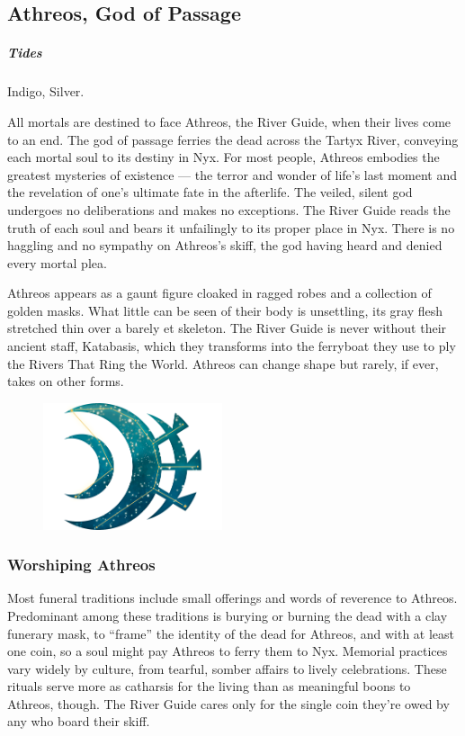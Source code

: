 \subsection*{Athreos, God of Passage} \label{ssec::athreos}
    \subparagraph{Tides} Indigo, Silver.

    All mortals are destined to face Athreos, the River Guide, when their lives come to an end.
    The god of passage ferries the dead across the Tartyx River, conveying each mortal soul to its destiny in Nyx.
    For most people, Athreos embodies the greatest mysteries of existence --- the terror and wonder of life's last moment and the revelation of one's ultimate fate in the afterlife.
    The veiled, silent god undergoes no deliberations and makes no exceptions.
    The River Guide reads the truth of each soul and bears it unfailingly to its proper place in Nyx.
    There is no haggling and no sympathy on Athreos's skiff, the god having heard and denied every mortal plea.

    Athreos appears as a gaunt figure cloaked in ragged robes and a collection of golden masks.
    What little can be seen of their body is unsettling, its gray flesh stretched thin over a barely et skeleton.
    The River Guide is never without their ancient staff, Katabasis, which they transforms into the ferryboat they use to ply the Rivers That Ring the World.
    Athreos can change shape but rarely, if ever, takes on other forms.

    \begin{figure}[t]
        \centering
        \includegraphics[width=0.47\textwidth]{02viphoger/img/10s_athreos.png}
    \end{figure}

    \subsubsection{Worshiping Athreos}
        Most funeral traditions include small offerings and words of reverence to Athreos.
        Predominant among these traditions is burying or burning the dead with a clay funerary mask, to ``frame'' the identity of the dead for Athreos, and with at least one coin, so a soul might pay Athreos to ferry them to Nyx.
        Memorial practices vary widely by culture, from tearful, somber affairs to lively celebrations.
        These rituals serve more as catharsis for the living than as meaningful boons to Athreos, though.
        The River Guide cares only for the single coin they're owed by any who board their skiff.

